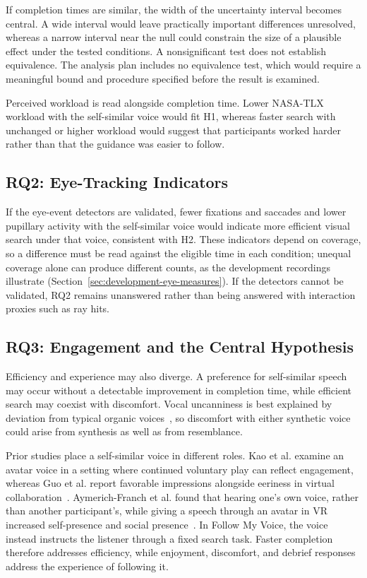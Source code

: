 If completion times are similar, the width of the uncertainty interval becomes central. A wide interval would leave practically important differences unresolved, whereas a narrow interval near the null could constrain the size of a plausible effect under the tested conditions. A nonsignificant test does not establish equivalence. The analysis plan includes no equivalence test, which would require a meaningful bound and procedure specified before the result is examined.

Perceived workload is read alongside completion time. Lower NASA-TLX workload with the self-similar voice would fit H1, whereas faster search with unchanged or higher workload would suggest that participants worked harder rather than that the guidance was easier to follow.

\subsection{RQ2: Eye-Tracking Indicators}
If the eye-event detectors are validated, fewer fixations and saccades and lower pupillary activity with the self-similar voice would indicate more efficient visual search under that voice, consistent with H2. These indicators depend on coverage, so a difference must be read against the eligible time in each condition; unequal coverage alone can produce different counts, as the development recordings illustrate (Section~\ref{sec:development-eye-measures}). If the detectors cannot be validated, RQ2 remains unanswered rather than being answered with interaction proxies such as ray hits.

\subsection{RQ3: Engagement and the Central Hypothesis}
Efficiency and experience may also diverge. A preference for self-similar speech may occur without a detectable improvement in completion time, while efficient search may coexist with discomfort. Vocal uncanniness is best explained by deviation from typical organic voices~\cite{diel2024uncanny}, so discomfort with either synthetic voice could arise from synthesis as well as from resemblance.

Prior studies place a self-similar voice in different roles. Kao et al. examine an avatar voice in a setting where continued voluntary play can reflect engagement, whereas Guo et al. report favorable impressions alongside eeriness in virtual collaboration~\cite{kao2021selfsimilar,guo2024doppelganger}. Aymerich-Franch et al. found that hearing one's own voice, rather than another participant's, while giving a speech through an avatar in VR increased self-presence and social presence~\cite{aymerich2012voicesimilarity}. In Follow My Voice, the voice instead instructs the listener through a fixed search task. Faster completion therefore addresses efficiency, while enjoyment, discomfort, and debrief responses address the experience of following it.

